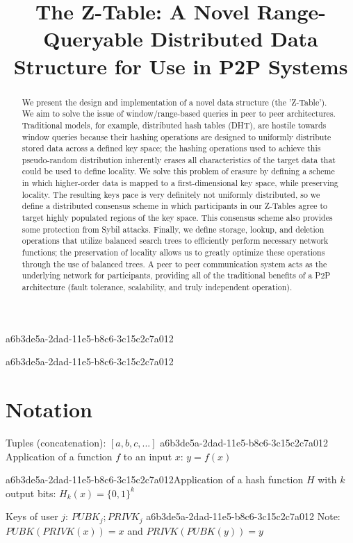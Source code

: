 \documentclass[12pt]{article}
\title{The Z-Table: A Novel Range-Queryable Distributed Data Structure for Use in P2P Systems}
\begin{document}
a6b3de5a-2dad-11e5-b8c6-3c15c2c7a012\maketitle

\begin{abstract}
We present the design and implementation of a novel data structure (the 'Z-Table'). We aim to solve the issue of window/range-based queries in peer to peer architectures. Traditional models, for example,  distributed hash tables (DHT), are hostile towards window queries because their hashing operations are designed to uniformly distribute stored data across a defined key space; the hashing operations used to achieve this pseudo-random distribution inherently erases all characteristics of the target data that could be used to define locality. We solve this problem of erasure by defining a scheme in which higher-order data is mapped to a first-dimensional key space, while preserving locality. The resulting keys pace is very definitely not uniformly distributed, so we define a distributed consensus scheme in which participants in our Z-Tables agree to target highly populated regions of the key space. This consensus scheme also provides some protection from Sybil attacks. Finally, we define storage, lookup, and deletion operations that utilize balanced search trees to efficiently perform necessary network functions; the preservation of locality allows us to greatly optimize these operations through the use of balanced trees. A peer to peer communication system acts as the underlying network for participants, providing all of the traditional benefits of a P2P architecture (fault tolerance, scalability, and truly independent operation).
\end{abstract}

a6b3de5a-2dad-11e5-b8c6-3c15c2c7a012\section{Notation}

Tuples (concatenation): $[a,b,c,...]$
a6b3de5a-2dad-11e5-b8c6-3c15c2c7a012
Application of a function $f$ to an input $x$: $y=f(x)$

a6b3de5a-2dad-11e5-b8c6-3c15c2c7a012Application of a hash function $H$ with $k$ output bits: $H_{k}(x) = \{0,1\}^k$

Keys of user $j$: $ PUBK_j; PRIVK_j $
a6b3de5a-2dad-11e5-b8c6-3c15c2c7a012
Note: $PUBK(PRIVK(x)) = x$ and $PRIVK(PUBK(y)) = y$~
\end{document}
